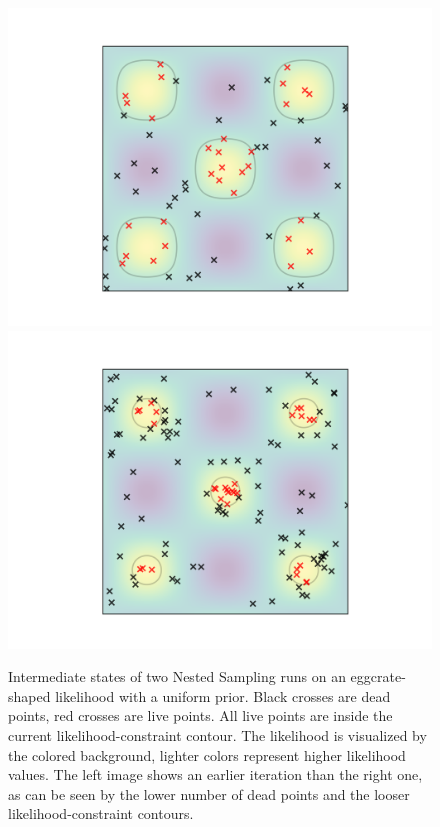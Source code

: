 \documentclass[12pt, a4paper]{report}
\begin{document}
\begin{figure}
    \centering
    \includegraphics[trim={3cm 1cm 2.4cm 1cm}, clip, scale=0.65]{figs/ns_eggcrate_example_1.png}
    \includegraphics[trim={2.4cm 1cm 3cm 1cm}, clip, scale=0.65]{figs/ns_eggcrate_example_2.png}
    \caption{Intermediate states of two Nested Sampling runs on an eggcrate-shaped likelihood with a uniform prior. Black crosses are dead points, red crosses are live points. All live points are inside the current likelihood-constraint contour. The likelihood is visualized by the colored background, lighter colors represent higher likelihood values. The left image shows an earlier iteration than the right one, as can be seen by the lower number of dead points and the looser likelihood-constraint contours.}
    \label{fig:ns_eggcrate_example}
\end{figure}
\end{document}
